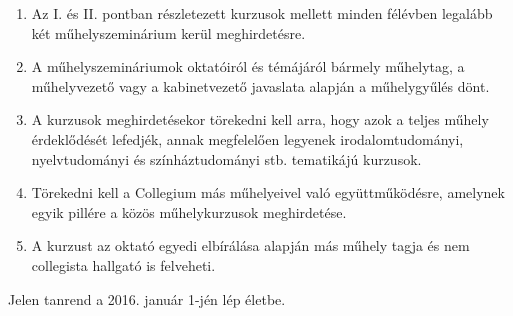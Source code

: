 \documentclass{../styles/curriculum}
\begin{document}
\begin{enumerate}
	\item Az I. és II. pontban részletezett kurzusok mellett minden félévben legalább  két műhelyszeminárium kerül meghirdetésre.
	\item A műhelyszemináriumok oktatóiról és témájáról bármely műhelytag, a műhelyvezető vagy a kabinetvezető javaslata alapján a műhelygyűlés dönt.
	\item A kurzusok meghirdetésekor törekedni kell arra, hogy azok a teljes műhely érdeklődését lefedjék, annak megfelelően legyenek irodalomtudományi, nyelvtudományi és színháztudományi stb. tematikájú kurzusok.
	\item Törekedni kell a Collegium más műhelyeivel való együttműködésre, amelynek egyik pillére a közös műhelykurzusok meghirdetése.
	\item A kurzust az oktató egyedi elbírálása alapján más műhely tagja és nem collegista hallgató is felveheti.
	
\end{enumerate}

\vspace{2em}


Jelen tanrend a 2016. január 1-jén lép életbe.
\end{document}
